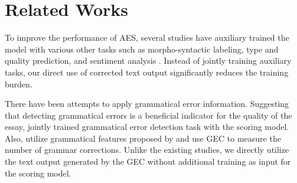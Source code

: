 \section{Related Works}


To improve the performance of AES, several studies have auxiliary trained the model with various other tasks such as morpho-syntactic labeling, type and quality prediction, and sentiment analysis \cite{gec_aes1, gec_aes2, gec_aes3}. Instead of jointly training auxiliary tasks, our direct use of corrected text output significantly reduces the training burden.

There have been attempts to apply grammatical error information. Suggesting that detecting grammatical errors is a beneficial indicator for the quality of the essay, \citet{gec_aes5} jointly trained grammatical error detection task with the scoring model. Also, \citet{gec_aes6} utilize grammatical features proposed by \citet{criterial_feature} and \citet{gec_aes7} use GEC to measure the number of grammar corrections. Unlike the existing studies, we directly utilize the text output generated by the GEC without additional training as input for the scoring model.
%


